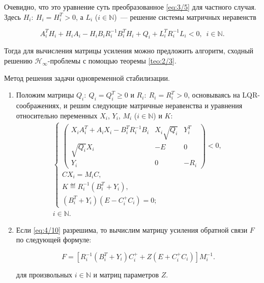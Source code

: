 Очевидно, что это уравнение суть преобразованное \ref{eq:3/5} для частного случая. Здесь $H_i\colon~H_i = H_i^T > 0$, а $L_i$ ($i \in \mathbb{N}$)~--- решение системы матричных неравенств

\begin{equation}
\label{eq:4/9}
A_i^TH_i + H_iA_i - H_iB_iR_i^{-1}B_i^TH_i + Q_i + L_i^TR_i^{-1}L_i < 0\mbox{,}~~~ i \in \mathbb{N}\mbox{.}
\end{equation}

Тогда для вычисления матрицы усиления можно предложить алгоритм, сходный решению $\mathcal{H}_\infty$-проблемы с помощью теоремы \vref{teo:2/3}.

\begin{alg}
\label{alg:4/2}
Метод решения задачи одновременной стабилизации.

\begin{enumerate}
\item Положим матрицы $Q_i\colon~Q_i = Q_i^T \geqslant 0$ и $R_i\colon~R_i = R_i^T > 0$, основываясь на LQR-соображениях, и решим следующие матричные неравенства и уравнения относительно переменных $X_i$, $Y_i$, $M_i$ ($i \in \mathbb{N}$) и $K$:
\begin{eqnarray}
\label{eq:4/10}
\left\{ \begin{array}{l}
         \left( \begin{array}{ccc}
                 X_iA_i^T + A_iX_i - B_i^TR_i^{-1}B_i  &  X_i\sqrt{Q_i}  &  Y_i^T \\
                 \sqrt{Q_i}X_i   &   -E   &   0 \\
                 Y_i   &   0   &   -R_i
                \end{array}
         \right) < 0\mbox{,} \\
         CX_i = M_iC\mbox{,} \\
         K \eqdef R_i^{-1}(B_i^T + Y_i)\mbox{,} \\
         (B_i^T + Y_i)(E - C_i^+C_i) = 0\mbox{;}
        \end{array} \right. \\
i \in \mathbb{N}\mbox{.} \nonumber
\end{eqnarray}

\item Если \vref{eq:4/10} разрешима, то вычислим матрицу усиления обратной связи $F$ по следующей формуле:

\begin{equation}
\label{eq:4/11}
F = [R_i^{-1}(B_i^T + Y_i)C_i^+ + Z(E + C_i^+C_i)]M_i^{-1}\mbox{.}
\end{equation}

для произвольных $i \in \mathbb{N}$ и матриц параметров $Z$.

\end{enumerate}

\end{alg}




